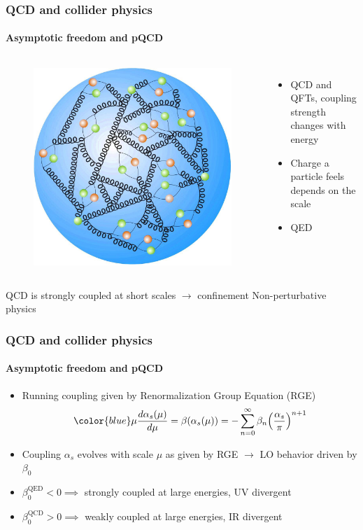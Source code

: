 \documentclass[aspectratio=43]{beamer}
\begin{document}
\begin{frame}

	\frametitle{QCD and collider physics}
	\framesubtitle{Asymptotic freedom and pQCD}

	\begin{columns}	
		
		
		\begin{figure}

			\includegraphics[width = 2 cm]{plots/part1/intro/proton2.jpg}
		\end{figure}
		
		
		\begin{itemize}
			\item \footnotesize QCD and QFTs, coupling strength changes with energy
			\item \footnotesize Charge a particle feels depends on the scale
			\item \footnotesize QED
		\end{itemize}
		
	\end{columns}
	
	\vspace{1cm}
	\center \footnotesize QCD is strongly coupled at short scales $\longrightarrow$ confinement
	\center \footnotesize \color{red} Non-perturbative physics

\end{frame}

\begin{frame}
	
	\frametitle{QCD and collider physics}
	\framesubtitle{Asymptotic freedom and pQCD}
	
	\begin{itemize}
		\item \footnotesize Running coupling given by Renormalization Group Equation (RGE)
		\begin{equation}
		{\color{blue}\mu\frac{d\alpha_{s}(\mu)}{d\mu} = \beta(\alpha_{s}(\mu)) = -\sum_{n = 0}^{\infty} \beta_{n} \Big( \frac{\alpha_{s}}{\pi} \Big)^{n + 1}} \nonumber
		\end{equation}
		\item \footnotesize Coupling {\color{blue}$\alpha_{s}$} evolves with scale {\color{blue}$\mu$} as given by RGE $\rightarrow$ LO behavior driven by $\beta_{0}$
		\item \footnotesize $\beta_{0}^{\textrm{QED}} < 0 \implies$ strongly coupled at large energies, {\color{blue}UV divergent}
		\item $\beta_{0}^{\textrm{QCD}} > 0 \implies$ weakly coupled at large energies, {\color{red}IR divergent}
	\end{itemize}

\end{frame}
\end{document}
